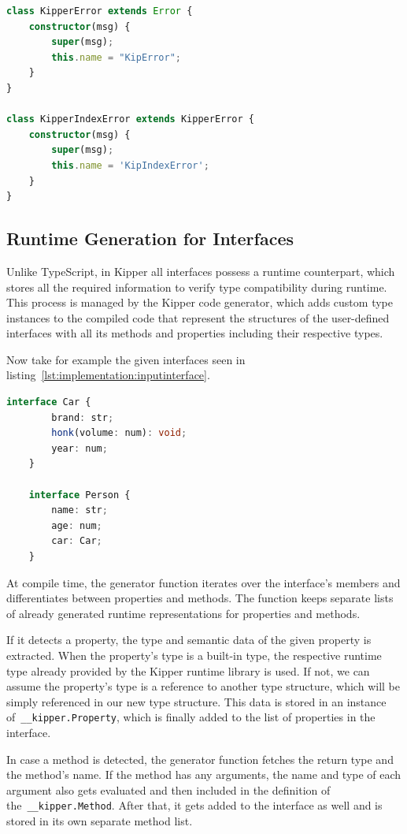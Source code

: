\begin{lstlisting}[language=Typescript,caption=Kipper error types,label=lst:implementation:kippererrortypes]
class KipperError extends Error {
	constructor(msg) {
		super(msg);
		this.name = "KipError";
	}
}

class KipperIndexError extends KipperError {
	constructor(msg) { 
		super(msg); 
		this.name = 'KipIndexError'; 
	} 
}
\end{lstlisting}

\subsection{Runtime Generation for Interfaces}

Unlike TypeScript, in Kipper all interfaces possess a runtime counterpart, which stores all the required information to verify type compatibility during runtime. This process is managed by the Kipper code generator, which adds custom type instances to the compiled code that represent the structures of the user-defined interfaces with all its methods and properties including their respective types.

Now take for example the given interfaces seen in listing~\ref{lst:implementation:inputinterface}.

\begin{lstlisting}[language=Typescript,caption=Example interfaces in the Kipper language,label=lst:implementation:inputinterface]
	interface Car {
		brand: str;
		honk(volume: num): void;
		year: num;
	}

	interface Person {
		name: str;
		age: num;
		car: Car;
	}
\end{lstlisting}

At compile time, the generator function iterates over the interface's members and differentiates between properties and methods. The function keeps separate lists of already generated runtime representations for properties and methods.

If it detects a property, the type and semantic data of the given property is extracted. When the property's type is a built-in type, the respective runtime type already provided by the Kipper runtime library is used. If not, we can assume the property's type is a reference to another type structure, which will be simply referenced in our new type structure. This data is stored in an instance of~\lstinline|__kipper.Property|, which is finally added to the list of properties in the interface.

In case a method is detected, the generator function fetches the return type and the method's name. If the method has any arguments, the name and type of each argument also gets evaluated and then included in the definition of the~\lstinline|__kipper.Method|. After that, it gets added to the interface as well and is stored in its own separate method list.

